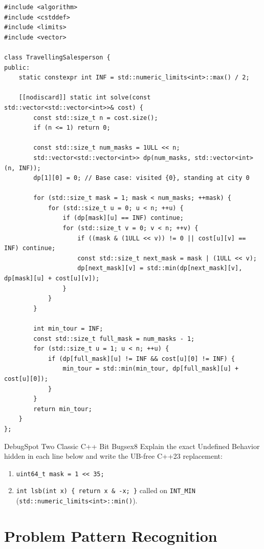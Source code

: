 \documentclass[11pt,a4paper]{article}
\theoremstyle{definition}
\begin{document}
\begin{lstlisting}[caption={Bitmask DP Travelling Salesperson solver in $O(N^2 \cdot 2^N)$ time}]
#include <algorithm>
#include <cstddef>
#include <limits>
#include <vector>

class TravellingSalesperson {
public:
    static constexpr int INF = std::numeric_limits<int>::max() / 2;

    [[nodiscard]] static int solve(const std::vector<std::vector<int>>& cost) {
        const std::size_t n = cost.size();
        if (n <= 1) return 0;

        const std::size_t num_masks = 1ULL << n;
        std::vector<std::vector<int>> dp(num_masks, std::vector<int>(n, INF));
        dp[1][0] = 0; // Base case: visited {0}, standing at city 0

        for (std::size_t mask = 1; mask < num_masks; ++mask) {
            for (std::size_t u = 0; u < n; ++u) {
                if (dp[mask][u] == INF) continue;
                for (std::size_t v = 0; v < n; ++v) {
                    if ((mask & (1ULL << v)) != 0 || cost[u][v] == INF) continue;
                    const std::size_t next_mask = mask | (1ULL << v);
                    dp[next_mask][v] = std::min(dp[next_mask][v], dp[mask][u] + cost[u][v]);
                }
            }
        }

        int min_tour = INF;
        const std::size_t full_mask = num_masks - 1;
        for (std::size_t u = 1; u < n; ++u) {
            if (dp[full_mask][u] != INF && cost[u][0] != INF) {
                min_tour = std::min(min_tour, dp[full_mask][u] + cost[u][0]);
            }
        }
        return min_tour;
    }
};
\end{lstlisting}

\begin{tryitbox}{Debug}{Spot Two Classic C++ Bit Bugs}{ex8}
Explain the exact Undefined Behavior hidden in each line below and write the UB-free C++23 replacement:
\begin{enumerate}[itemsep=1pt, topsep=2pt]
    \item \texttt{uint64\_t mask = 1 << 35;}
    \item \texttt{int lsb(int x) \{ return x \& -x; \}} called on \texttt{INT\_MIN} (\texttt{std::numeric\_limits<int>::min()}).
\end{enumerate}
\end{tryitbox}

\section{Problem Pattern Recognition}
\end{document}
